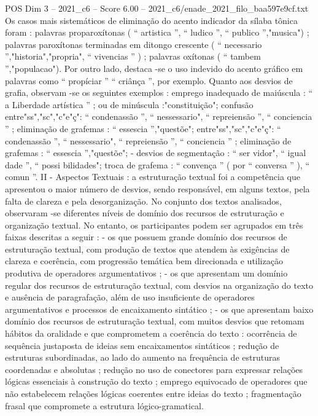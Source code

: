 \begin{textsample}{POS Dim 3 – 2021\_c6 – Score 6.00 – 2021\_c6/enade\_2021\_filo\_baa597e9cf.txt}
Os casos mais sistemáticos de eliminação do acento indicador da sílaba tônica foram : palavras proparoxítonas ( “ artistica ”, “ ludico ”, “ publico ”,"musica") ; palavras paroxítonas terminadas em ditongo crescente ( “ necessario ”,"historia","propria", “ vivencias ” ) ; palavras oxítonas ( “ tambem ”,"populacao").
Por outro lado, destaca -se o uso indevido do acento gráfico em palavras como “ propíciar ” “ criânça ”, por exemplo.
Quanto aos desvios de grafia, observam -se os seguintes exemplos : emprego inadequado de maiúscula : “ a Liberdade artística ” ; ou de minúscula :"constituição"; confusão entre"ss","sc","c"e"ç": “ condenassão ”, “ nessessario", “ repreiensão ”, “ conciencia ” ; eliminação de grafemas : “ essescia ”,"questõe"; entre"ss","sc","c"e"ç": “ condenassão ”, “ nessessario", “ repreiensão ”, “ conciencia ” ; eliminação de grafemas : “ essescia ”,"questõe"; - desvios de segmentação : “ ser vidor", “ igual dade ”, “ possi bilidades"; troca de grafema : “ convença ” ( por “ conversa ” ), “ comun ”.
II - Aspectos Textuais : a estruturação textual foi a competência que apresentou o maior número de desvios, sendo responsável, em alguns textos, pela falta de clareza e pela desorganização.
No conjunto dos textos analisados, observaram -se diferentes níveis de domínio dos recursos de estruturação e organização textual.
No entanto, os participantes podem ser agrupados em três faixas descritas a seguir : - os que possuem grande domínio dos recursos de estruturação textual, com produção de textos que atendem às exigências de clareza e coerência, com progressão temática bem direcionada e utilização produtiva de operadores argumentativos ; - os que apresentam um domínio regular dos recursos de estruturação textual, com desvios na organização do texto e ausência de paragrafação, além de uso insuficiente de operadores argumentativos e processos de encaixamento sintático ; - os que apresentam baixo domínio dos recursos de estruturação textual, com muitos desvios que retomam hábitos da oralidade e que comprometem a coerência do texto : ocorrência de sequência justaposta de ideias sem encaixamentos sintáticos ; redução de estruturas subordinadas, ao lado do aumento na frequência de estruturas coordenadas e absolutas ; redução no uso de conectores para expressar relações lógicas essenciais à construção do texto ; emprego equivocado de operadores que não estabelecem relações lógicas coerentes entre ideias do texto ; fragmentação frasal que compromete a estrutura lógico-gramatical.

\end{textsample}
